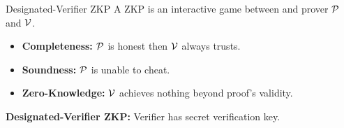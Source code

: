 \begin{frame}{Designated-Verifier ZKP}
	A ZKP is an interactive game between and prover $\mathcal{P}$ and $\mathcal{V}$.
	\begin{itemize}
		\item \textbf{Completeness:} $\mathcal{P}$ is honest then $\mathcal{V}$ always trusts.
		\item \textbf{Soundness:} $\mathcal{P}$ is unable to cheat.
		\item \textbf{Zero-Knowledge:} $\mathcal{V}$ achieves nothing beyond proof's validity.
	\end{itemize}
	
	\textbf{Designated-Verifier ZKP:} Verifier has secret verification key.
\end{frame}